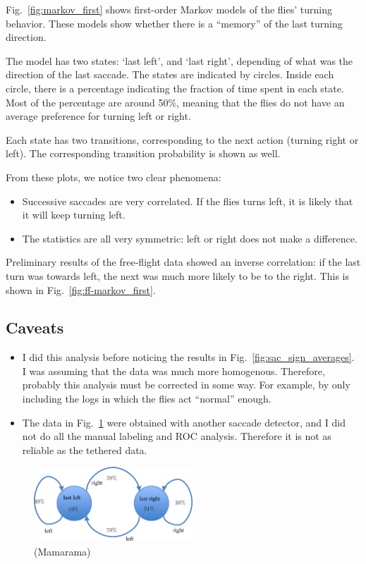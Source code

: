 Fig.~\ref{fig:markov_first} shows  first-order Markov models of the flies' turning behavior. These models show whether there is a ``memory'' of the last turning direction.

The model has two states: `last left', and `last right', depending of what was the direction of the last saccade. The states are indicated by circles. Inside each circle, there is a percentage indicating the fraction of time spent in each state. 
Most of the percentage are around 50\%, meaning that the flies do not have an average preference for turning left or right.

Each state has two transitions, corresponding to the next action (turning right or left). The corresponding transition probability is shown as well.

From these plots, we notice two clear phenomena:

\begin{itemize} 
	\item  Successive saccades are very correlated. If the flies turns left, it is likely that it will keep turning left.
	
	\item  The statistics are all very symmetric: left or right does not make a difference.
	
\end{itemize}

Preliminary results of the free-flight data showed an inverse correlation: if the last turn was towards left, the next was much more likely to be to the right.  This is shown in  Fig.~\vref{fig:ff-markov_first}. 

\subsection*{Caveats}
\begin{itemize}
	\item I did this analysis before noticing the results in Fig.~\ref{fig:sac_sign_averages}. I was assuming that the data was much more homogenous. Therefore, probably this analysis must be corrected in some way. For example, by only including the logs in which the flies act ``normal'' enough.
\item The data in Fig.~\ref{fig:ff-markov_first} were obtained with another saccade detector, and I did not do all the manual labeling and ROC analysis. Therefore it is not as reliable as the tethered data.
\end{itemize}
\vfill
\begin{figure}[h!]
	\centering
	\includegraphics[width=6cm]{../comments/freeflight/markov_first}
	\caption{ \label{fig:ff-markov_first}  \Dmelanogaster (Mamarama) }
\end{figure}
